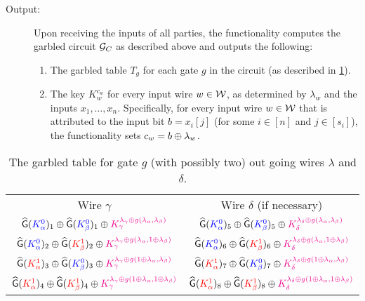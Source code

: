 \begin{definition}
\begin{description}
\item[Output:] Upon receiving the inputs of all parties, the functionality computes the garbled circuit $\mathcal{G}_C$ as described above and outputs the following:
\begin{enumerate}
    \item The garbled table $T_g$ for each gate $g$ in the circuit (as described in \cref{table:garbledGate}). 
    \item The key $K_w^{c_w}$ for every input wire $w\in{\cal W}$, as determined by $\lambda_w$ and the inputs $x_1,\ldots,x_n$. Specifically, for every input wire $w\in{\cal W}$ that is attributed to the input bit $b = x_i[j]$ (for some $i\in [n]$ and $j\in [s_i]$), the functionality sets $c_w= b\oplus\lambda_w$.
\end{enumerate}
\end{description}
\begin{table}[h!]
\centering
\begin{tabular}{ |c|c| } 
 \hline
 Wire $\gamma$ & Wire $\delta$ (if necessary)  \\ 
 $\widehat{\mathsf{G}}(\textcolor{blue}{K_{\alpha}^{0}})_1 \oplus \widehat{\mathsf{G}}(\textcolor{blue}{K_{\beta}^{0}})_1 \oplus \textcolor{magenta}{K_\gamma^{\lambda_\gamma\oplus g(\lambda_\alpha, \lambda_\beta)}}$ & $\widehat{\mathsf{G}}(\textcolor{blue}{K_{\alpha}^{0}})_5 \oplus \widehat{\mathsf{G}}(\textcolor{blue}{K_{\beta}^{0}})_5 \oplus \textcolor{magenta}{K_\delta^{\lambda_\delta\oplus g(\lambda_\alpha, \lambda_\beta)}}$  \\ 
 $\widehat{\mathsf{G}}(\textcolor{blue}{K_{\alpha}^{0}})_2 \oplus \widehat{\mathsf{G}}(\textcolor{red}{K_{\beta}^{1}})_2 \oplus \textcolor{magenta}{K_\gamma^{\lambda_\gamma\oplus g(\lambda_\alpha, 1\oplus\lambda_\beta)}}$ & $\widehat{\mathsf{G}}(\textcolor{blue}{K_{\alpha}^{0}})_6 \oplus \widehat{\mathsf{G}}(\textcolor{red}{K_{\beta}^{1}})_6 \oplus \textcolor{magenta}{K_\delta^{\lambda_\delta\oplus g(\lambda_\alpha, 1\oplus\lambda_\beta)}}$  \\
  $\widehat{\mathsf{G}}(\textcolor{red}{K_{\alpha}^{1}})_3 \oplus \widehat{\mathsf{G}}(\textcolor{blue}{K_{\beta}^{0}})_3 \oplus \textcolor{magenta}{K_\gamma^{\lambda_\gamma\oplus g(1\oplus\lambda_\alpha, \lambda_\beta)}}$ & $\widehat{\mathsf{G}}(\textcolor{red}{K_{\alpha}^{1}})_7 \oplus \widehat{\mathsf{G}}(\textcolor{blue}{K_{\beta}^{0}})_7 \oplus \textcolor{magenta}{K_\delta^{\lambda_\delta\oplus g(1\oplus\lambda_\alpha, \lambda_\beta)}}$  \\
   $\widehat{\mathsf{G}}(\textcolor{red}{K_{\alpha}^{1}})_4 \oplus \widehat{\mathsf{G}}(\textcolor{red}{K_{\beta}^{1}})_4 \oplus \textcolor{magenta}{K_\gamma^{\lambda_\gamma\oplus g(1\oplus\lambda_\alpha, 1\oplus\lambda_\beta)}}$ & $\widehat{\mathsf{G}}(\textcolor{red}{K_{\alpha}^{1}})_8 \oplus \widehat{\mathsf{G}}(\textcolor{red}{K_{\beta}^{1}})_8 \oplus \textcolor{magenta}{K_\delta^{\lambda_\delta\oplus g(1\oplus\lambda_\alpha, 1\oplus\lambda_\beta)}}$  \\
 \hline
\end{tabular}
\caption{The garbled table for gate $g$ (with possibly two) out going wires $\lambda$ and $\delta$.}\label{table:garbledGate}
\end{table}

\end{definition}



